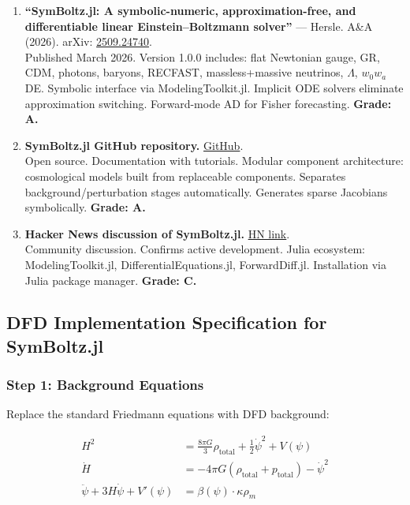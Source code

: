 \documentclass[11pt,a4paper]{article}
\begin{document}
\begin{enumerate}
\item \textbf{``SymBoltz.jl: A symbolic-numeric, approximation-free, and differentiable linear Einstein--Boltzmann solver''} --- Hersle. A\&A (2026). arXiv: \href{https://arxiv.org/abs/2509.24740}{2509.24740}.\\
Published March 2026. Version 1.0.0 includes: flat Newtonian gauge, GR, CDM, photons, baryons, RECFAST, massless+massive neutrinos, $\Lambda$, $w_0w_a$DE. Symbolic interface via ModelingToolkit.jl. Implicit ODE solvers eliminate approximation switching. Forward-mode AD for Fisher forecasting. \textbf{Grade: A.}

\item \textbf{SymBoltz.jl GitHub repository.} \href{https://github.com/hersle/SymBoltz.jl}{GitHub}.\\
Open source. Documentation with tutorials. Modular component architecture: cosmological models built from replaceable components. Separates background/perturbation stages automatically. Generates sparse Jacobians symbolically. \textbf{Grade: A.}

\item \textbf{Hacker News discussion of SymBoltz.jl.} \href{https://news.ycombinator.com/item?id=45464706}{HN link}.\\
Community discussion. Confirms active development. Julia ecosystem: ModelingToolkit.jl, DifferentialEquations.jl, ForwardDiff.jl. Installation via Julia package manager. \textbf{Grade: C.}
\end{enumerate}

\subsection{DFD Implementation Specification for SymBoltz.jl}

\subsubsection{Step 1: Background Equations}

Replace the standard Friedmann equations with DFD background:

\begin{align}
H^2 &= \frac{8\pi G}{3}\rho_\mathrm{total} + \frac{1}{2}\dot{\psi}^2 + V(\psi) \\
\dot{H} &= -4\pi G(\rho_\mathrm{total} + p_\mathrm{total}) - \dot{\psi}^2 \\
\ddot{\psi} + 3H\dot{\psi} + V'(\psi) &= \beta(\psi) \cdot \kappa \rho_m
\end{align}
\end{document}
